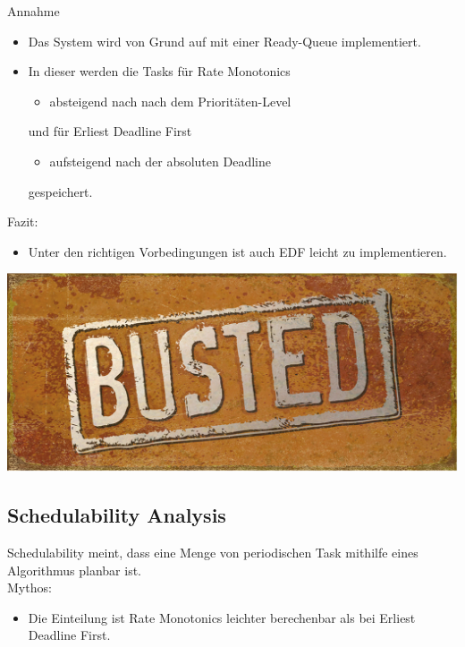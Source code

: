 \begin{frame}{\subsecname}
	Annahme
	\begin{itemize}
		\item Das System wird von Grund auf mit einer Ready-Queue implementiert.\pause
		\item In dieser werden die Tasks für Rate Monotonics
			\begin{itemize}
				\item absteigend nach nach dem Prioritäten-Level
			\end{itemize}
			und für Erliest Deadline First
			\begin{itemize}
				\item aufsteigend nach der absoluten Deadline
			\end{itemize} gespeichert.
	\end{itemize}
\end{frame}

\begin{frame}{\subsecname}
	Fazit:
	\begin{itemize}
		\item Unter den richtigen Vorbedingungen ist auch EDF leicht zu implementieren.
	\end{itemize}
\end{frame}

\begin{frame}{\subsecname}
	\begin{center}
			\includegraphics[scale=1]{graphics/memes/busted.jpg}
	\end{center}
\end{frame}



\subsection{Schedulability Analysis}\label{SchedulabilityAnalaysis}
\begin{frame}{\subsecname}
	Schedulability meint, dass eine Menge von periodischen Task mithilfe eines Algorithmus planbar ist.\\[2ex]
	Mythos:\pause
	\begin{itemize}
		\item Die Einteilung ist Rate Monotonics leichter berechenbar als bei Erliest Deadline First.
	\end{itemize}
\end{frame}

